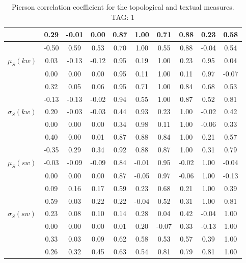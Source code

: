 \begin{table*}[h!]
\begin{center}
\begin{tabular}{| l | c | c | c | c | c | c | c | c | c |}
 & 0.29  & -0.01  & 0.00  & 0.87  & 1.00  & 0.71  & 0.88  & 0.23  & 0.58 \\\hline
 & -0.50  & 0.59  & 0.53  & 0.70  & 1.00  & 0.55  & 0.88  & -0.04  & 0.54 \\\hline
$\mu_S(kw)$ & 0.03  & -0.13  & -0.12  & 0.95  & 0.19  & 1.00  & 0.23  & 0.95  & 0.04 \\\hline
 & 0.00  & 0.00  & 0.00  & 0.95  & 0.11  & 1.00  & 0.11  & 0.97  & -0.07 \\\hline
 & 0.32  & 0.05  & 0.06  & 0.95  & 0.71  & 1.00  & 0.84  & 0.68  & 0.53 \\\hline
 & -0.13  & -0.13  & -0.02  & 0.94  & 0.55  & 1.00  & 0.87  & 0.52  & 0.81 \\\hline
$\sigma_S(kw)$ & 0.20  & -0.03  & -0.03  & 0.44  & 0.93  & 0.23  & 1.00  & -0.02  & 0.42 \\\hline
 & 0.00  & 0.00  & 0.00  & 0.34  & 0.98  & 0.11  & 1.00  & -0.06  & 0.33 \\\hline
 & 0.40  & 0.00  & 0.01  & 0.87  & 0.88  & 0.84  & 1.00  & 0.21  & 0.57 \\\hline
 & -0.35  & 0.29  & 0.34  & 0.92  & 0.88  & 0.87  & 1.00  & 0.31  & 0.79 \\\hline
$\mu_S(sw)$ & -0.03  & -0.09  & -0.09  & 0.84  & -0.01  & 0.95  & -0.02  & 1.00  & -0.04 \\\hline
 & 0.00  & 0.00  & 0.00  & 0.87  & -0.05  & 0.97  & -0.06  & 1.00  & -0.13 \\\hline
 & 0.09  & 0.16  & 0.17  & 0.59  & 0.23  & 0.68  & 0.21  & 1.00  & 0.39 \\\hline
 & 0.59  & 0.03  & 0.22  & 0.22  & -0.04  & 0.52  & 0.31  & 1.00  & 0.81 \\\hline
$\sigma_S(sw)$ & 0.23  & 0.08  & 0.10  & 0.14  & 0.28  & 0.04  & 0.42  & -0.04  & 1.00 \\\hline
 & 0.00  & 0.00  & 0.00  & 0.01  & 0.20  & -0.07  & 0.33  & -0.13  & 1.00 \\\hline
 & 0.33  & 0.03  & 0.09  & 0.62  & 0.58  & 0.53  & 0.57  & 0.39  & 1.00 \\\hline
 & 0.26  & 0.32  & 0.45  & 0.63  & 0.54  & 0.81  & 0.79  & 0.81  & 1.00 \\\hline
\end{tabular}
\caption{Pierson correlation coefficient for the topological and textual measures. TAG: 1}
\end{center}
\end{table*}